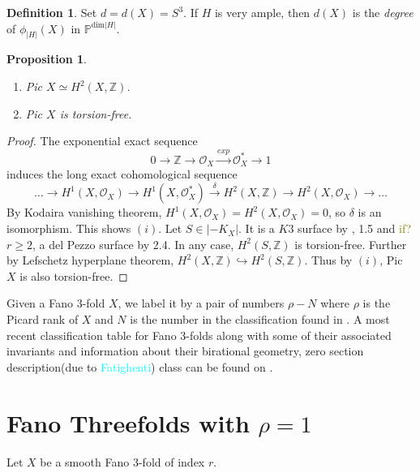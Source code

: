 \documentclass[11pt]{amsart}
\theoremstyle{plain}
\newtheorem{proposition}[theorem]{Proposition}
\theoremstyle{definition}
\newtheorem{definition}[theorem]{Definition}
\theoremstyle{expl}
\begin{document}
\begin{definition}
    Set $d = d(X) =S^3$. If $H$ is very ample, then $d(X)$ is the \textit{degree} of $\phi_{|H|}(X)$ in $\mathbb{P}^{\text{dim}|H|}$.
\end{definition}
\begin{proposition}
	\begin{enumerate}
		\item[(i)] Pic $X \simeq H^2(X,\mathbb{Z})$.
		\item[(ii)] Pic $X$ is torsion-free. 
	\end{enumerate}
\end{proposition}
\begin{proof}
	The exponential exact sequence 
	\[
	0 \rightarrow \mathbb{Z} \rightarrow \mathcal{O}_X  \xrightarrow{exp} \mathcal{O}_X^* \rightarrow 1
	\]
	 induces the long exact cohomological sequence 
	 \[
	 \dots \rightarrow H^1(X,\mathcal{O}_X) \rightarrow H^1(X,\mathcal{O}_X^*) \xrightarrow{\delta} H^2(X,\mathbb{Z}) \rightarrow H^2(X,\mathcal{O}_X)\rightarrow \dots 
	 \]
	 By Kodaira vanishing theorem, $H^1(X,\mathcal{O}_X) = H^2(X,\mathcal{O}_X) =0$, so $\delta$ is an isomorphism. This shows $(i)$. Let $S \in |-K_X|$. It is a $K3$ surface by \cite{Isk77}, 1.5 and \textcolor{olive}{if?} $r \geq 2$, a del Pezzo surface by 2.4. In any case, $H^2(S,\mathbb{Z})$ is torsion-free. Further by Lefschetz hyperplane theorem, $H^2(X,\mathbb{Z}) \hookrightarrow H^2(S,\mathbb{Z})$. Thus by $(i)$, Pic $X$ is also torsion-free.
\end{proof}
 
\noindent Given a Fano $3$-fold $X$, we label it by a pair of numbers $\rho-N$ where $\rho$ is the Picard rank of $X$ and $N$ is the number in the classification found in \cite{FanoV}. A most recent classification table for Fano $3$-folds along with some of their associated invariants and information about their birational geometry, zero section description(due to \textcolor{cyan}{Fatighenti}) class can be found on \cite{Fano}.

	  
\section{Fano Threefolds with $\rho =1$}
\noindent Let $X$ be a smooth Fano $3$-fold of index $r$. 
\end{document}
